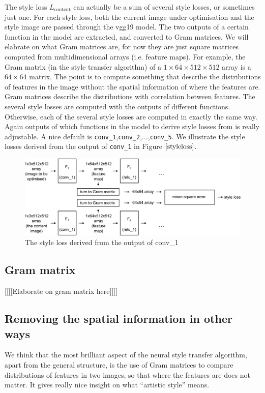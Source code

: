 \documentclass[runningheads]{llncs}
\begin{document}
The style loss $L_\text{content}$ can actually be a sum of several style losses, or sometimes just one.
For each style loss, 
both the current image under optimisation and the style image are passed through the vgg19 model.
The two outputs of a certain function in the model are extracted, 
and converted to Gram matrices. We will elabrate on what Gram matrices are,
for now they are just square matrices computed from multidimensional arrays (i.e. feature maps).
For example, the Gram matrix (in the style transfer algorithm) of a $1\times64\times512\times512$ array
is a $64\times64$ matrix.
The point is to compute something that describe the distributions of features
in the image without the spatial information of where the features are.
Gram matrices describe the distributions with correlation between features.
The several style losses are computed with the outputs of different functions.
Otherwise, each of the several style losses are computed in exactly the same way.
Again outputs of which functions in the model to derive style losses from is really adjustable.
A nice default is \verb|conv_1|,\verb|conv_2|,...,\verb|conv_5|. We illustrate
the style losses derived from the output of \verb|conv_1| in Figure $\ref{styleloss}$.

\begin{figure}
\center
\includegraphics[width=\textwidth]{styleloss.pdf}
\caption{The style loss derived from the output of conv\_1 \label{styleloss}}
\end{figure}

\subsection{Gram matrix}
[[[[Elaborate on gram matrix here]]]]

\subsection{Removing the spatial information in other ways}
We think that the most brilliant aspect of the neural style transfer algorithm,
apart from the general structure, is the use of Gram matrices to compare 
distributions of features in two images, so that where the features are does not matter.
It gives really nice insight on what ``artistic style'' means.
\end{document}
